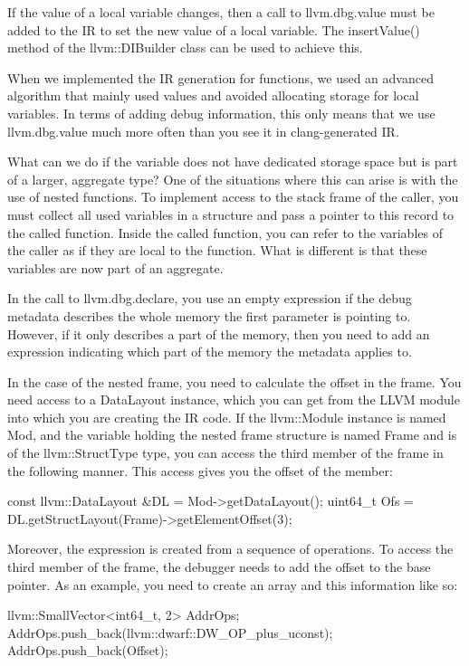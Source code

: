 If the value of a local variable changes, then a call to llvm.dbg.value must be added to the IR to set the new value of a local variable. The insertValue() method of the llvm::DIBuilder class can be used to achieve this.

When we implemented the IR generation for functions, we used an advanced algorithm that mainly used values and avoided allocating storage for local variables. In terms of adding debug information, this only means that we use llvm.dbg.value much more often than you see it in clang-generated IR.

What can we do if the variable does not have dedicated storage space but is part of a larger, aggregate type? One of the situations where this can arise is with the use of nested functions. To implement access to the stack frame of the caller, you must collect all used variables in a structure and pass a pointer to this record to the called function. Inside the called function, you can refer to the variables of the caller as if they are local to the function. What is different is that these variables are now part of an aggregate.

In the call to llvm.dbg.declare, you use an empty expression if the debug metadata describes the whole memory the first parameter is pointing to. However, if it only describes a part of the memory, then you need to add an expression indicating which part of the memory the metadata applies to.

In the case of the nested frame, you need to calculate the offset in the frame. You need access to a DataLayout instance, which you can get from the LLVM module into which you are creating the IR code. If the llvm::Module instance is named Mod, and the variable holding the nested frame structure is named Frame and is of the llvm::StructType type, you can access the third member of the frame in the following manner. This access gives you the offset of the member:

\begin{cpp}
const llvm::DataLayout &DL = Mod->getDataLayout();
uint64_t Ofs = DL.getStructLayout(Frame)->getElementOffset(3);
\end{cpp}

Moreover, the expression is created from a sequence of operations. To access the third member of the frame, the debugger needs to add the offset to the base pointer. As an example, you need to create an array and this information like so:

\begin{cpp}
llvm::SmallVector<int64_t, 2> AddrOps;
AddrOps.push_back(llvm::dwarf::DW_OP_plus_uconst);
AddrOps.push_back(Offset);
\end{cpp}


